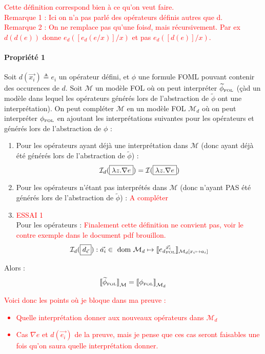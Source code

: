 \documentclass[12pt]{article}
\newcommand{\FOL}{\ensuremath{\textup{\tiny{}FOL}}}
\newcommand{\M}{\ensuremath{\mathcal{M}}}
\newcommand{\I}{\ensuremath{\mathcal{I}}}
\newcommand{\raph}[1]{\textcolor{red}{#1}}
\begin{document}
\raph{%
  Cette définition correspond bien à ce qu'on veut faire.\\
  Remarque 1 : Ici on n'a pas parlé des opérateurs définis autres que d.\\
  Remarque 2 : On ne remplace pas \og{}qu'une fois\fg $d$, mais récursivement.
  Par ex $d(d(e))$ donne $e_d([e_d(e/x)]/x)$ et pas $e_d([d(e)]/x)$.}


\paragraph{Propriété 1}
\label{prop_sem}
Soit $d(\vec{x_i}) \triangleq e_i$ un opérateur défini, et $\phi$ une formule FOML pouvant contenir des occurences de $d$.
Soit $\mathcal{M}$ un modèle FOL où on peut interpréter $\widetilde{\phi}_\FOL$ (çàd un modèle dans lequel les opérateurs  générés lors de l'abstraction de $\widetilde{\phi}$ ont une interprétation).
On peut compléter $\M$ en un modèle FOL $\M_d$ où on peut interpréter $\phi_\FOL$ en ajoutant les interprétations suivantes pour les opérateurs  et  générés lors de l'abstraction de $\phi$ :
\begin{enumerate}
\item
  Pour les opérateurs  ayant déjà une interprétation dans $\M$ (donc ayant déjà été générés lors de l'abstraction de $\widetilde{\phi}$) :
  \[ \I_d(\framebox{$\lambda z . \nabla e$}) = \I(\framebox{$\lambda z . \nabla e$}) \]
\item
  Pour les opérateurs  n'étant pas interprétés dans $\M$ (donc n'ayant PAS été générés lors de l'abstraction de $\widetilde{\phi}$) :
  \raph{A compléter}
\item
  \raph{ESSAI 1}\\
  Pour les opérateurs  : \raph{Finalement cette définition ne convient pas, voir le contre exemple dans le document pdf \og{}brouillon\fg .}
  \[
    \mathcal{I}_d(\framebox{$d_{\vec{\epsilon}}$}) : \vec{a_i} \in \textup{ dom } \mathcal{M}_d \mapsto
    \llbracket {e_d}_\FOL^{\vec{x_i}} \rrbracket_{\mathcal{M}_d[x_i \mapsto a_i]}
  \]
\end{enumerate}
Alors :
\[
  {\llbracket \widetilde{\phi}_\FOL \rrbracket}_{\mathcal{M}} = {\llbracket \phi_\FOL \rrbracket}_{\mathcal{M}_d}
\]

\raph{%
  Voici donc les points où je bloque dans ma preuve :
  \begin{itemize}
  \item
    Quelle interprétation donner aux nouveaux opérateurs dans $\mathcal{M}_d$
  \item
    Cas $\nabla e$ et $d(\vec{e_i})$ de la preuve, mais je pense que ces cas seront faisables une fois qu'on saura quelle interprétation donner.
  \end{itemize}}
\end{document}
